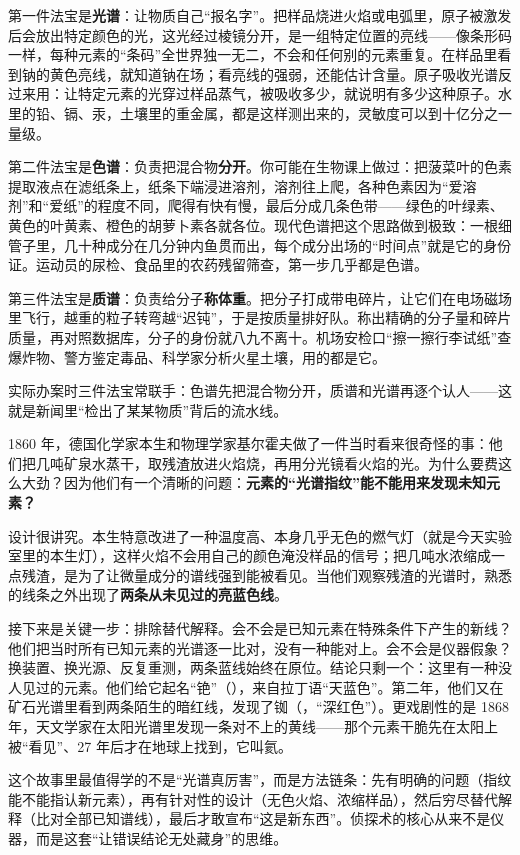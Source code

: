 第一件法宝是\textbf{光谱}：让物质自己“报名字”。把样品烧进火焰或电弧里，原子被激发后会放出特定颜色的光，这光经过棱镜分开，是一组特定位置的亮线——像条形码一样，每种元素的“条码”全世界独一无二，不会和任何别的元素重复。在样品里看到钠的黄色亮线，就知道钠在场；看亮线的强弱，还能估计含量。原子吸收光谱反过来用：让特定元素的光穿过样品蒸气，被吸收多少，就说明有多少这种原子。水里的铅、镉、汞，土壤里的重金属，都是这样测出来的，灵敏度可以到十亿分之一量级。

第二件法宝是\textbf{色谱}：负责把混合物\textbf{分开}。你可能在生物课上做过：把菠菜叶的色素提取液点在滤纸条上，纸条下端浸进溶剂，溶剂往上爬，各种色素因为“爱溶剂”和“爱纸”的程度不同，爬得有快有慢，最后分成几条色带——绿色的叶绿素、黄色的叶黄素、橙色的胡萝卜素各就各位。现代色谱把这个思路做到极致：一根细管子里，几十种成分在几分钟内鱼贯而出，每个成分出场的“时间点”就是它的身份证。运动员的尿检、食品里的农药残留筛查，第一步几乎都是色谱。

第三件法宝是\textbf{质谱}：负责给分子\textbf{称体重}。把分子打成带电碎片，让它们在电场磁场里飞行，越重的粒子转弯越“迟钝”，于是按质量排好队。称出精确的分子量和碎片质量，再对照数据库，分子的身份就八九不离十。机场安检口“擦一擦行李试纸”查爆炸物、警方鉴定毒品、科学家分析火星土壤，用的都是它。

实际办案时三件法宝常联手：色谱先把混合物分开，质谱和光谱再逐个认人——这就是新闻里“检出了某某物质”背后的流水线。

\begin{zhengju}
1860 年，德国化学家本生和物理学家基尔霍夫做了一件当时看来很奇怪的事：他们把几吨矿泉水蒸干，取残渣放进火焰烧，再用分光镜看火焰的光。为什么要费这么大劲？因为他们有一个清晰的问题：\textbf{元素的“光谱指纹”能不能用来发现未知元素？}

设计很讲究。本生特意改进了一种温度高、本身几乎无色的燃气灯（就是今天实验室里的本生灯），这样火焰不会用自己的颜色淹没样品的信号；把几吨水浓缩成一点残渣，是为了让微量成分的谱线强到能被看见。当他们观察残渣的光谱时，熟悉的线条之外出现了\textbf{两条从未见过的亮蓝色线}。

接下来是关键一步：排除替代解释。会不会是已知元素在特殊条件下产生的新线？他们把当时所有已知元素的光谱逐一比对，没有一种能对上。会不会是仪器假象？换装置、换光源、反复重测，两条蓝线始终在原位。结论只剩一个：这里有一种没人见过的元素。他们给它起名“铯”（），来自拉丁语“天蓝色”。第二年，他们又在矿石光谱里看到两条陌生的暗红线，发现了铷（，“深红色”）。更戏剧性的是 1868 年，天文学家在太阳光谱里发现一条对不上的黄线——那个元素干脆先在太阳上被“看见”、27 年后才在地球上找到，它叫氦。

这个故事里最值得学的不是“光谱真厉害”，而是方法链条：先有明确的问题（指纹能不能指认新元素），再有针对性的设计（无色火焰、浓缩样品），然后穷尽替代解释（比对全部已知谱线），最后才敢宣布“这是新东西”。侦探术的核心从来不是仪器，而是这套“让错误结论无处藏身”的思维。
\end{zhengju}

